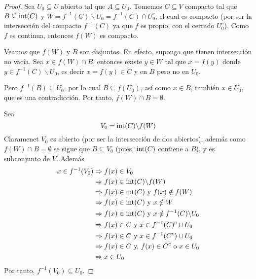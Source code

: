 \documentclass[12pt]{report}
\theoremstyle{largebreak}
\begin{document}
\begin{proof}
    Sea $U_0\subseteq U$ abierto tal que $A\subseteq U_0$. Tomemos $C\subseteq V$ compacto tal que $B\subseteq \textup{int}(C)$ y $W=f^{-1}(C)\backslash U_0=f^{-1}(C)\cap U_0^c$, el cual es compacto (por ser la intersección del compacto $f^{-1}(C)$ ya que $f$ es propio, con el cerrado $U_0^c$). Como $f$ es continua, entonces $f(W)$ es compacto.
    
    Veamos que $f(W)$ y $B$ son disjuntos. En efecto, suponga que tienen intersección no vacía. Sea $x\in f(W)\cap B$, entonces existe $y\in W$ tal que $x=f(y)$ donde $y\in f^{-1}(C)\backslash U_0$, es decir $x=f(y)\in C$ y en $B$ pero no en $U_0$.

    Pero $f^{-1}(B)\subseteq U_0$, por lo cual $B\subseteq f(U_0)$, así como $x\in B$, también $x\in U_0$, que es una contradicción. Por tanto, $f(W)\cap B=\emptyset$.
    
    Sea
    \begin{equation*}
        V_0=\textup{int}(C)\backslash f(W)
    \end{equation*}
    Claramenet $V_0$ es abierto (por ser la intersección de dos abiertos), además como $f(W)\cap B=\emptyset$ se sigue que $B\subseteq V_0$ (pues, $\textup{int}(C)$ contiene a $B$), y es subconjunto de $V$. Además
    \begin{equation*}
        \begin{split}
            x\in f^{-1}(V_0)&\Rightarrow f(x)\in V_0\\
            &\Rightarrow f(x)\in \textup{int}(C)\backslash f(W)\\
            &\Rightarrow f(x)\in \textup{int}(C)\textup{ y } f(x)\notin f(W)\\
            &\Rightarrow f(x)\in \textup{int}(C)\textup{ y } x\notin W\\
            &\Rightarrow f(x)\in \textup{int}(C)\textup{ y } x\notin f^{-1}(C)\backslash U_0\\
            &\Rightarrow f(x)\in C\textup{ y } x\in f^{-1}(C)^c\cup U_0\\
            &\Rightarrow f(x)\in C\textup{ y } x\in f^{-1}(C^c)\cup U_0\\
            &\Rightarrow f(x)\in C\textup{ y, } f(x)\in C^c\textup{ o }x\in U_0\\
            &\Rightarrow x\in U_0\\
        \end{split}
    \end{equation*}
    Por tanto, $f^{-1}(V_0)\subseteq U_0$.
\end{proof}
\end{document}
